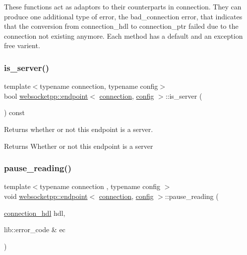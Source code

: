 These functions act as adaptors to their counterparts in connection. They can produce one additional type of error, the bad\+\_\+connection error, that indicates that the conversion from connection\+\_\+hdl to connection\+\_\+ptr failed due to the connection not existing anymore. Each method has a default and an exception free varient. \mbox{\label{classwebsocketpp_1_1endpoint_a4f6a1e239250ef6c485865e2adf65b1b}} 
\subsubsection{\texorpdfstring{is\+\_\+server()}{is\_server()}}
{\footnotesize\ttfamily template$<$typename connection, typename config$>$ \\
bool \mbox{\hyperlink{classwebsocketpp_1_1endpoint}{websocketpp\+::endpoint}}$<$ \mbox{\hyperlink{classwebsocketpp_1_1connection}{connection}}, \mbox{\hyperlink{classconfig}{config}} $>$\+::is\+\_\+server (\begin{DoxyParamCaption}{ }\end{DoxyParamCaption}) const\hspace{0.3cm}{\ttfamily [inline]}}



Returns whether or not this endpoint is a server. 

\begin{DoxyReturn}{Returns}
Whether or not this endpoint is a server 
\end{DoxyReturn}
\mbox{\label{classwebsocketpp_1_1endpoint_aef7666b82bf98864b213c3df09298595}} 
\subsubsection{\texorpdfstring{pause\+\_\+reading()}{pause\_reading()}}
{\footnotesize\ttfamily template$<$typename connection , typename config $>$ \\
void \mbox{\hyperlink{classwebsocketpp_1_1endpoint}{websocketpp\+::endpoint}}$<$ \mbox{\hyperlink{classwebsocketpp_1_1connection}{connection}}, \mbox{\hyperlink{classconfig}{config}} $>$\+::pause\+\_\+reading (\begin{DoxyParamCaption}\item[{\mbox{\hyperlink{namespacewebsocketpp_a6b3d26a10ee7229b84b776786332631d}{connection\+\_\+hdl}}}]{hdl,  }\item[{lib\+::error\+\_\+code \&}]{ec }\end{DoxyParamCaption})}



